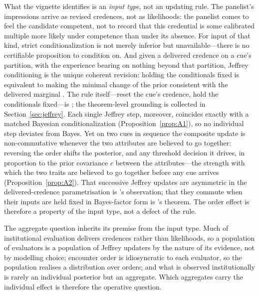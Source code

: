 \documentclass[review,12pt,authoryear]{elsarticle}
\theoremstyle{remark}
\theoremstyle{definition}
\begin{document}
What the vignette identifies is an \emph{input type}, not an updating rule. The panelist's
impressions arrive as revised credences, not as likelihoods: the panelist comes to feel the
candidate competent, not to record that this credential is some calibrated multiple more likely
under competence than under its absence. For input of that kind, strict conditionalization is
not merely inferior but unavailable---there is no certifiable proposition to condition on. And
given a delivered credence on a cue's partition, with the experience bearing on nothing beyond
that partition, Jeffrey conditioning is the unique coherent revision: holding the conditionals
fixed is equivalent to making the minimal change of the prior consistent with the delivered
marginal \citep{DiaconisZabell1982}. The rule itself---reset the cue's credence, hold the
conditionals fixed---is \citet[ch.~11]{Jeffrey1983}; the theorem-level grounding is collected in
Section~\ref{sec:jeffrey}. Each single Jeffrey step, moreover, coincides exactly with a matched
Bayesian conditionalization (Proposition~\ref{prop:A1}), so no individual step deviates from
Bayes. Yet on two cues in sequence the composite update is non-commutative whenever the two
attributes are believed to go together: reversing the order shifts the posterior, and any
threshold decision it drives, in proportion to the prior covariance $c$ between the
attributes---the strength with which the two traits are believed to go together before any cue
arrives (Proposition~\ref{prop:A2}). That successive Jeffrey updates are asymmetric in the
delivered-credence parametrisation is \citet{Field1978}'s observation; that they commute when
their inputs are held fixed in Bayes-factor form is \citet{Wagner2002}'s theorem. The order
effect is therefore a property of the input type, not a defect of the rule.

The aggregate question inherits its premise from the input type. Much of institutional
evaluation delivers credences rather than likelihoods, so a population of evaluators is a
population of Jeffrey updaters by the nature of its evidence, not by modelling choice; encounter
order is idiosyncratic to each evaluator, so the population realises a distribution over orders;
and what is observed institutionally is rarely an individual posterior but an aggregate. Which
aggregates carry the individual effect is therefore the operative question.
\end{document}
